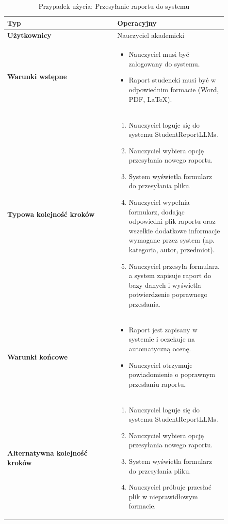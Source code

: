 \documentclass[a4paper, 12pt]{article}
\begin{document}
\begin{table}[H]
\footnotesize
\centering
\caption{Przypadek użycia: Przesyłanie raportu do systemu}
\begin{tabular}{|p{0.45\linewidth}|p{0.45\linewidth}|}
\hline
\textbf{Typ} & Operacyjny \\
\hline
\textbf{Użytkownicy} & Nauczyciel akademicki \\
\hline
\textbf{Warunki wstępne} &
\begin{itemize}
    \item Nauczyciel musi być zalogowany do systemu.
    \item Raport studencki musi być w odpowiednim formacie (Word, PDF, LaTeX).
\end{itemize} \\
\hline
\textbf{Typowa kolejność kroków} &
\begin{enumerate}
    \item Nauczyciel loguje się do systemu StudentReportLLMs.
    \item Nauczyciel wybiera opcję przesyłania nowego raportu.
    \item System wyświetla formularz do przesyłania pliku.
    \item Nauczyciel wypełnia formularz, dodając odpowiedni plik raportu oraz wszelkie dodatkowe informacje wymagane przez system (np. kategoria, autor, przedmiot).
    \item Nauczyciel przesyła formularz, a system zapisuje raport do bazy danych i wyświetla potwierdzenie poprawnego przesłania.
\end{enumerate} \\
\hline
\textbf{Warunki końcowe} &
\begin{itemize}
    \item Raport jest zapisany w systemie i oczekuje na automatyczną ocenę.
    \item Nauczyciel otrzymuje powiadomienie o poprawnym przesłaniu raportu.
\end{itemize} \\
\hline
\textbf{Alternatywna kolejność kroków} &
\begin{enumerate}
    \item Nauczyciel loguje się do systemu StudentReportLLMs.
    \item Nauczyciel wybiera opcję przesyłania nowego raportu.
    \item System wyświetla formularz do przesyłania pliku.
    \item Nauczyciel próbuje przesłać plik w nieprawidłowym formacie.

\end{enumerate}
\end{tabular}
\end{table}
\end{document}
